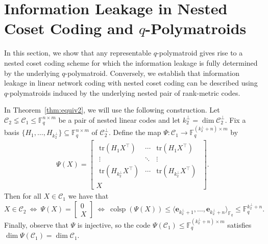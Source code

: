 \documentclass[onecolumn,draftclsnofoot,12pt]{IEEEtran}
\newcommand{\F}{\mathbb{F}}
\newcommand{\C}{\mathcal{C}}
\newcommand{\colsp}{\operatorname{colsp}}
\theoremstyle{plain} %
\theoremstyle{definition}
\begin{document}
\section{Information Leakage in Nested Coset Coding and \texorpdfstring{$q$}{q}-Polymatroids} \label{sec:leakage}
In this section, we show that any representable $q$-polymatroid gives rise to a nested coset coding scheme for which the information leakage is fully determined by the underlying $q$-polymatroid. Conversely, we establish that information leakage in linear network coding with nested coset coding can be described using $q$-polymatroids induced by the underlying nested pair of rank-metric codes.

In Theorem~\ref{thm:equiv2}, we will use the following construction. Let $\C_2 \lneq \C_1 \leq\F_q^{n\times m}$ be a pair of nested linear codes and let $k_2^\perp = \dim \C_2^\perp$. Fix a basis $\{H_1,\ldots,H_{k_2^\perp}\} \subseteq \F_q^{n\times m}$ of $\C_2^\perp$.  Define the map $\Psi\colon \C_1 \rightarrow \F_q^{(k_2^\perp + n )\times m}$ by
\begin{align} 
    \Psi(X) = \begin{bmatrix} \begin{matrix}
    \mathrm{tr}(H_1 X^\top) & \cdots & \mathrm{tr}(H_1 X^\top)  \\
    \vdots & \ddots & \vdots \\ 
    \mathrm{tr}(H_{k_2^\perp} X^\top) & \cdots & \mathrm{tr}(H_{k_2^\perp} X^\top) 
\end{matrix}  \\ X\end{bmatrix}. \label{eq:paddedcode}
\end{align}
Then for all $X\in \C_1$ we have that
\[
    X\in \C_2 \: \Longleftrightarrow \:\Psi(X) = \begin{bmatrix}
    0 \\ X
\end{bmatrix} \: \Longleftrightarrow \:\colsp( \Psi(X)) \leq \langle \mathbf{e}_{ k_2^\perp + 1},\ldots,\mathbf{e}_{k_2^\perp+n} \rangle_{\F_q} \leq \F_q^{k_2^\perp +n}.
\]
Finally, observe that $\Psi$ is injective, so the code $\Psi(\C_1) \leq \F_q^{(k_2^\perp + n)\times m}$ satisfies $\dim \Psi(\C_1) = \dim \C_1$.
\end{document}
